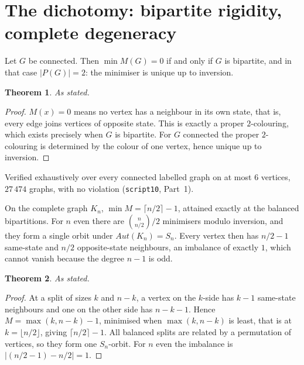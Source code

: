 \documentclass[11pt,a4paper]{article}
\def\mathrm#1{#1}%
\def\mathcal#1{#1}%
\newtheorem{theorem}{Theorem}[section]
\newcommand{\Aut}{\mathrm{Aut}}
\newcommand{\Kn}{K_n}
\begin{document}
\section{The dichotomy: bipartite rigidity, complete degeneracy}
\label{sec:dichotomy}

\begin{theorembox}
Let $G$ be connected. Then $\min M(G)=0$ if and only if $G$ is bipartite, and in that case $|\mathcal{P}(G)|=2$: the minimiser is unique up to inversion.
\end{theorembox}

\begin{theorem}
\label{thm:bipartite}
As stated.
\end{theorem}

\begin{proof}
$M(x)=0$ means no vertex has a neighbour in its own state, that is, every edge joins vertices of opposite state. This is exactly a proper $2$-colouring, which exists precisely when $G$ is bipartite. For $G$ connected the proper $2$-colouring is determined by the colour of one vertex, hence unique up to inversion.
\end{proof}

Verified exhaustively over every connected labelled graph on at most $6$ vertices, $27\,474$ graphs, with no violation (\texttt{script10}, Part~1).

\begin{theorembox}
On the complete graph $\Kn$, $\min M=\lceil n/2\rceil-1$, attained exactly at the balanced bipartitions. For $n$ even there are $\binom{n}{n/2}/2$ minimisers modulo inversion, and they form a single orbit under $\Aut(\Kn)=S_n$. Every vertex then has $n/2-1$ same-state and $n/2$ opposite-state neighbours, an imbalance of exactly $1$, which cannot vanish because the degree $n-1$ is odd.
\end{theorembox}

\begin{theorem}
\label{thm:complete}
As stated.
\end{theorem}

\begin{proof}
At a split of sizes $k$ and $n-k$, a vertex on the $k$-side has $k-1$ same-state neighbours and one on the other side has $n-k-1$. Hence $M=\max(k,n-k)-1$, minimised when $\max(k,n-k)$ is least, that is at $k=\lfloor n/2\rfloor$, giving $\lceil n/2\rceil-1$. All balanced splits are related by a permutation of vertices, so they form one $S_n$-orbit. For $n$ even the imbalance is $|(n/2-1)-n/2|=1$.
\end{proof}
\end{document}
